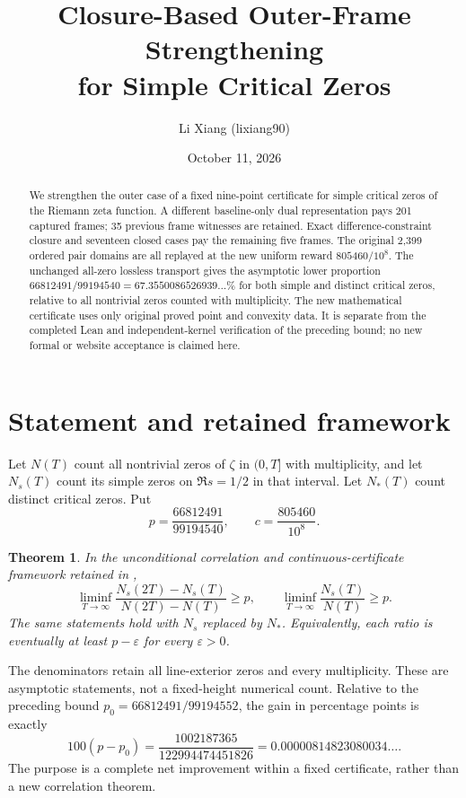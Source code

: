 \documentclass[11pt]{article}
\title{Closure-Based Outer-Frame Strengthening\\for Simple Critical Zeros}
\author{Li Xiang (lixiang90)}
\date{October 11, 2026}
\newtheorem{theorem}{Theorem}[section]
\begin{document}
\maketitle
\begin{abstract}
We strengthen the outer case of a fixed nine-point certificate for
simple critical zeros of the Riemann zeta function. A different
baseline-only dual representation pays 201 captured frames; 35
previous frame witnesses are retained. Exact difference-constraint
closure and seventeen closed cases pay the remaining five frames.
The original 2,399 ordered pair domains are all replayed at the new
uniform reward $805460/10^8$. The unchanged all-zero lossless
transport gives the asymptotic lower proportion
$66812491/99194540=67.3550086526939\ldots\%$ for both simple and
distinct critical zeros, relative to all nontrivial zeros counted
with multiplicity. The new mathematical certificate uses only
original proved point and convexity data. It is separate from the
completed Lean and independent-kernel verification of the preceding
bound; no new formal or website acceptance is claimed here.
\end{abstract}

\section{Statement and retained framework}
Let $N(T)$ count all nontrivial zeros of $\zeta$ in $(0,T]$ with
multiplicity, and let $N_s(T)$ count its simple zeros on
$\Re s=1/2$ in that interval. Let $N_*(T)$ count distinct critical
zeros. Put
\[
 p=\frac{66812491}{99194540},\qquad c=\frac{805460}{10^8}.
\]
\begin{theorem}\label{thm:main}
In the unconditional correlation and continuous-certificate
framework retained in \cite{Lossless,Ninth,Joint},
\[
 \liminf_{T\to\infty}\frac{N_s(2T)-N_s(T)}{N(2T)-N(T)}\ge p,
 \qquad
 \liminf_{T\to\infty}\frac{N_s(T)}{N(T)}\ge p.
\]
The same statements hold with $N_s$ replaced by $N_*$. Equivalently,
each ratio is eventually at least $p-\varepsilon$ for every
$\varepsilon>0$.
\end{theorem}
The denominators retain all line-exterior zeros and every
multiplicity. These are asymptotic statements, not a fixed-height
numerical count. Relative to the preceding bound
$p_0=66812491/99194552$, the gain in percentage points is exactly
\[
 100(p-p_0)=\frac{1002187365}{122994474451826}
 =0.00000814823080034\ldots.
\]
The purpose is a complete net improvement within a fixed
certificate, rather than a new correlation theorem.
\end{document}
